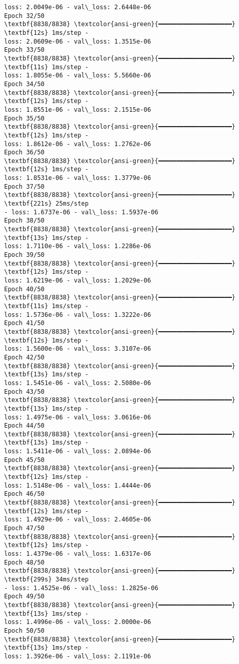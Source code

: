 \documentclass[11pt]{article}
\begin{document}
\begin{Verbatim}[commandchars=\\\{\}]
loss: 2.0049e-06 - val\_loss: 2.6448e-06
Epoch 32/50
\textbf{8838/8838} \textcolor{ansi-green}{━━━━━━━━━━━━━━━━━━━━} \textbf{12s} 1ms/step -
loss: 2.0609e-06 - val\_loss: 1.3515e-06
Epoch 33/50
\textbf{8838/8838} \textcolor{ansi-green}{━━━━━━━━━━━━━━━━━━━━} \textbf{11s} 1ms/step -
loss: 1.8055e-06 - val\_loss: 5.5660e-06
Epoch 34/50
\textbf{8838/8838} \textcolor{ansi-green}{━━━━━━━━━━━━━━━━━━━━} \textbf{12s} 1ms/step -
loss: 1.8551e-06 - val\_loss: 2.1515e-06
Epoch 35/50
\textbf{8838/8838} \textcolor{ansi-green}{━━━━━━━━━━━━━━━━━━━━} \textbf{12s} 1ms/step -
loss: 1.8612e-06 - val\_loss: 1.2762e-06
Epoch 36/50
\textbf{8838/8838} \textcolor{ansi-green}{━━━━━━━━━━━━━━━━━━━━} \textbf{12s} 1ms/step -
loss: 1.8531e-06 - val\_loss: 1.3779e-06
Epoch 37/50
\textbf{8838/8838} \textcolor{ansi-green}{━━━━━━━━━━━━━━━━━━━━} \textbf{221s} 25ms/step
- loss: 1.6737e-06 - val\_loss: 1.5937e-06
Epoch 38/50
\textbf{8838/8838} \textcolor{ansi-green}{━━━━━━━━━━━━━━━━━━━━} \textbf{13s} 1ms/step -
loss: 1.7110e-06 - val\_loss: 1.2286e-06
Epoch 39/50
\textbf{8838/8838} \textcolor{ansi-green}{━━━━━━━━━━━━━━━━━━━━} \textbf{12s} 1ms/step -
loss: 1.6219e-06 - val\_loss: 1.2029e-06
Epoch 40/50
\textbf{8838/8838} \textcolor{ansi-green}{━━━━━━━━━━━━━━━━━━━━} \textbf{11s} 1ms/step -
loss: 1.5736e-06 - val\_loss: 1.3222e-06
Epoch 41/50
\textbf{8838/8838} \textcolor{ansi-green}{━━━━━━━━━━━━━━━━━━━━} \textbf{12s} 1ms/step -
loss: 1.5600e-06 - val\_loss: 3.3107e-06
Epoch 42/50
\textbf{8838/8838} \textcolor{ansi-green}{━━━━━━━━━━━━━━━━━━━━} \textbf{13s} 1ms/step -
loss: 1.5451e-06 - val\_loss: 2.5080e-06
Epoch 43/50
\textbf{8838/8838} \textcolor{ansi-green}{━━━━━━━━━━━━━━━━━━━━} \textbf{13s} 1ms/step -
loss: 1.4975e-06 - val\_loss: 3.0616e-06
Epoch 44/50
\textbf{8838/8838} \textcolor{ansi-green}{━━━━━━━━━━━━━━━━━━━━} \textbf{13s} 1ms/step -
loss: 1.5411e-06 - val\_loss: 2.0894e-06
Epoch 45/50
\textbf{8838/8838} \textcolor{ansi-green}{━━━━━━━━━━━━━━━━━━━━} \textbf{12s} 1ms/step -
loss: 1.5148e-06 - val\_loss: 1.4444e-06
Epoch 46/50
\textbf{8838/8838} \textcolor{ansi-green}{━━━━━━━━━━━━━━━━━━━━} \textbf{12s} 1ms/step -
loss: 1.4929e-06 - val\_loss: 2.4605e-06
Epoch 47/50
\textbf{8838/8838} \textcolor{ansi-green}{━━━━━━━━━━━━━━━━━━━━} \textbf{12s} 1ms/step -
loss: 1.4379e-06 - val\_loss: 1.6317e-06
Epoch 48/50
\textbf{8838/8838} \textcolor{ansi-green}{━━━━━━━━━━━━━━━━━━━━} \textbf{299s} 34ms/step
- loss: 1.4525e-06 - val\_loss: 1.2825e-06
Epoch 49/50
\textbf{8838/8838} \textcolor{ansi-green}{━━━━━━━━━━━━━━━━━━━━} \textbf{13s} 1ms/step -
loss: 1.4996e-06 - val\_loss: 2.0000e-06
Epoch 50/50
\textbf{8838/8838} \textcolor{ansi-green}{━━━━━━━━━━━━━━━━━━━━} \textbf{13s} 1ms/step -
loss: 1.3926e-06 - val\_loss: 2.1191e-06
    \end{Verbatim}
\end{document}
